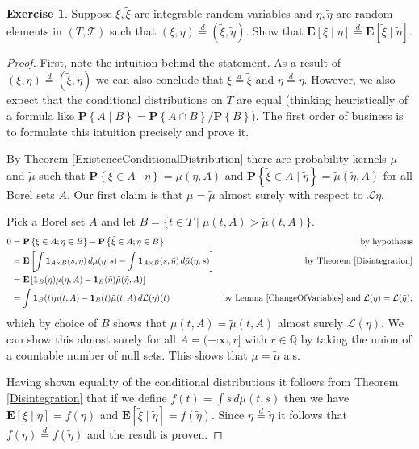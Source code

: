 \documentclass{amsbook}
\theoremstyle{definition}
\newtheorem{xca}{Exercise}
\theoremstyle{remark}
\newcommand{\expectation}[1]{\textbf{E}\left[#1\right]}
\newcommand{\cexpectationlong}[2]{\textbf{E}\left[ #2 \mid #1 \right]}
\newcommand{\probability}[1]{\textbf{P}\left \{#1 \right \}}
\newcommand{\cprobability}[2]{\textbf{P} \left \{#2 \mid #1 \right \}}
\newcommand{\characteristic}[1]{\textbf{1}_{#1}}
\newcommand{\rationals}{\mathbb{Q}}
\newcommand{\eqdist}{\overset{d}=}
\begin{document}
\begin{xca}Suppose $\xi, \tilde{\xi}$ are integrable random variables
  and $\eta, \tilde{\eta}$ are random elements in $(T, \mathcal{T})$
  such that $(\xi,\eta) \eqdist (\tilde{\xi}, \tilde{\eta})$.  Show
  that $\cexpectationlong{\eta}{\xi} \eqdist \cexpectationlong{\tilde{\eta}}{\tilde{\xi}}$.
\end{xca}
\begin{proof}
First, note the intuition behind the statement.  As a result of
$(\xi,\eta) \eqdist (\tilde{\xi}, \tilde{\eta})$ we can also conclude
that $\xi \eqdist \tilde{\xi}$ and $\eta \eqdist \tilde{\eta}$.
However, we also expect that the conditional distributions on $T$ are
equal (thinking heuristically of a formula like $\cprobability{B}{A} =
\probability{A \cap B} / \probability{B}$).  The first order of
business is to formulate this intuition precisely and prove it.

By Theorem \ref{ExistenceConditionalDistribution} there are
probability kernels $\mu$ and $\tilde{\mu}$ such that
$\cprobability{\eta}{\xi \in A} = \mu(\eta, A)$ and
$\cprobability{\tilde{\eta}}{\tilde{\xi} \in A} =
\tilde{\mu}(\tilde{\eta}, A)$ for all Borel sets $A$.  Our first claim
is that $\mu = \tilde{\mu}$ almost surely with respect to
$\mathcal{L}{\eta}$.

Pick a Borel set $A$ and let $B = \lbrace t \in T \mid \mu(t, A) >
\tilde{\mu}(t, A) \rbrace$. 
\begin{align*}
0 &= \probability{\xi \in A; \eta \in B} - \probability{\tilde{\xi}
  \in A; \tilde{\eta} \in B} & \text{by hypothesis}\\
&=\expectation{\int \characteristic{A \times B}(s, \eta) \,
  d\mu(\eta, s) - \int \characteristic{A \times B}(s, \tilde{\eta}) \,
  d\tilde{\mu}(\eta, s)} & \text{by Theorem \ref{Disintegration}}\\
&=\expectation{\characteristic{B}(\eta) \mu(\eta, A) -
  \characteristic{B}(\tilde{\eta}) \tilde{\mu}(\tilde{\eta}, A)} \\
&=\int \characteristic{B}(t) \mu(t, A) -
  \characteristic{B}(t) \tilde{\mu}(t, A) \, d\mathcal{L}(\eta)(t) &
  \text{by Lemma \ref{ChangeOfVariables} and $\mathcal{L}(\eta) = \mathcal{L}(\tilde{\eta})$.}
\end{align*}
which by choice of $B$ shows that $\mu(t, A) =\tilde{\mu}(t, A)$
almost surely $\mathcal{L}(\eta)$.  We can show this almost surely for all $A =
(-\infty, r]$ with $r \in \rationals$ by taking the union of a
countable number of null sets.  This shows that $\mu = \tilde{\mu}$
a.s.

Having shown equality of the conditional distributions it follows from
Theorem \ref{Disintegration} that if we define $f(t) = \int s \, d\mu(t,
s)$ then we have $\cexpectationlong{\eta}{\xi} = f(\eta)$ and
$\cexpectationlong{\tilde{\eta}}{\tilde{\xi}} = f(\tilde{\eta})$.
Since $\eta \eqdist \tilde{\eta}$ it follows that $f(\eta) \eqdist
f(\tilde{\eta})$ and the result is proven.
\end{proof}
\end{document}
